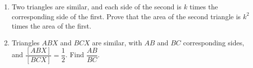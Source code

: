 \begin{enumerate}
\item[(a)] Two triangles are similar, and each side of the second is $k$ times the corresponding side of the first. Prove that the area of the second triangle is $k^2$ times the area of the first.
\item[(b)] Triangles $ABX$ and $BCX$ are similar, with $AB$ and $BC$ corresponding sides, and $\dfrac{[ABX]}{[BCX]}=\dfrac12$. Find $\dfrac{AB}{BC}$.
\end{enumerate}
